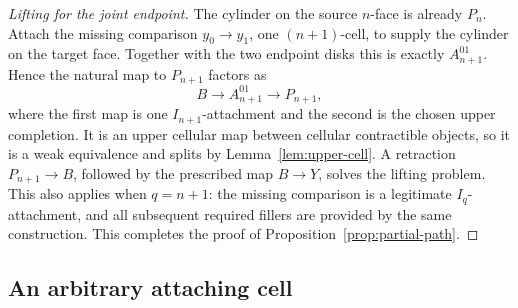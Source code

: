 \documentclass[11pt,letterpaper]{article}
\numberwithin{equation}{section}
\theoremstyle{plain}
\theoremstyle{definition}
\theoremstyle{remark}
\begin{document}
\begin{proof}[Lifting for the joint endpoint]
The cylinder on the source \(n\)-face is already \(P_n\).
Attach the missing comparison \(y_0\to y_1\), one
\((n+1)\)-cell, to supply the cylinder on the target face.  Together
with the two endpoint disks this is exactly
\(A_{n+1}^{01}\).  Hence the natural map to \(P_{n+1}\)
factors as
\[
                 B\longrightarrow A_{n+1}^{01}
                        \longrightarrow P_{n+1},
\]
where the first map is one \(I_{n+1}\)-attachment and the second
is the chosen upper completion.  It is an upper cellular map between
cellular contractible objects, so it is a weak equivalence and splits
by Lemma~\ref{lem:upper-cell}.  A retraction
\(P_{n+1}\to B\), followed by the prescribed map \(B\to Y\),
solves the lifting problem.  This also applies when \(q=n+1\):
the missing comparison is a legitimate \(I_q\)-attachment, and
all subsequent required fillers are provided by the same construction.
This completes the proof of Proposition~\ref{prop:partial-path}.
\end{proof}

\subsection{An arbitrary attaching cell}
\end{document}
